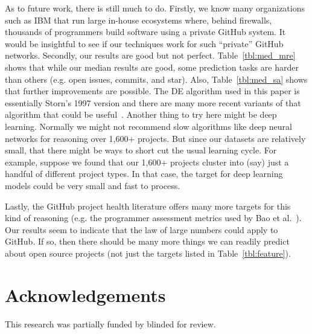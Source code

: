 \documentclass[sigconf,anonymous,review]{acmart}
\newcommand{\tbl}[1]{Table~\ref{tbl:#1}}
\begin{document}
As to future work, there is still much to do. Firstly, we know many organizations such as IBM that run large in-house ecosystems where, behind firewalls, thousands of programmers build software using  a private GitHub system. It would be insightful to see if our techniques work for such ``private'' GitHub networks.
Secondly, our results are good but not perfect. 
Table~\ref{tbl:med_mre} shows that while our median results are good, some prediction tasks are harder than others
(e.g. open issues, commits, and star).
Also, Table~\ref{tbl:med_sa} shows that further improvements are possible. The DE algorithm used in this paper is essentially Storn's 1997 version and there are many more recent variants of that algorithm that could be useful~\cite{wu2018ensemble,das2016recent}. Another thing to try here might be deep learning. Normally we might not recommend slow algorithms like deep neural networks for reasoning over 1,600+ projects. But since our datasets are relatively small, that there might be ways to short cut the usual learning cycle. For example, suppose we found that our 1,600+ projects cluster into (say) just a handful of different project types. In that case, the target for deep learning models could be very small and fast to process.


Lastly, the GitHub project health literature offers many more targets for this kind of reasoning (e.g. the programmer assessment metrics
used by Bao et al.~\cite{bao2019large}).  Our results seem to indicate that   the law of large numbers could apply to GitHub. If so, then there should be many more things we can readily predict about open source  projects (not just the targets listed in \tbl{feature}).

\vspace{3mm}

\section*{Acknowledgements}
This research was partially funded by blinded for review.


\newpage \balance


\end{document}
